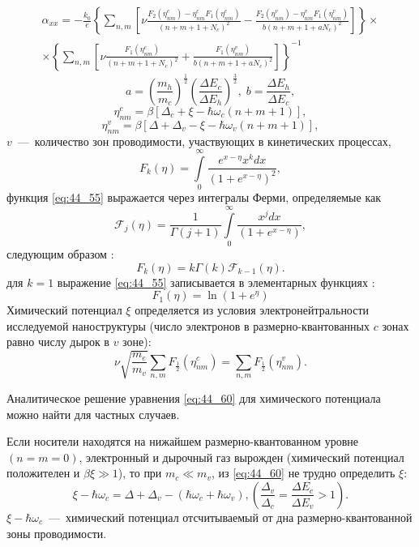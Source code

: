 \begin{multline} \label{eq:44_50}
\alpha _{xx} =-\frac{k_0}{e} \left\{\sum_{n,m}\left[\nu \frac{F_2 \left(\eta_{nm}^c \right)-\eta _{nm}^c F_1 \left(\eta_{nm}^c \right)}{\left(n+m+1+N_c \right)^2 } -\frac{F_2 \left(\eta_{nm}^v \right)-\eta_{nm}^v F_1 \left(\eta_{nm}^v \right)}{b\left(n+m+1+aN_c \right)^2 } \right] \right\}\times\\
\times \left\{\sum _{n,m}\left[\nu \frac{F_1 \left(\eta_{nm}^c \right)}{\left(n+m+1+N_c \right)^2 } +\frac{F_1 \left(\eta_{nm}^v \right)}{b\left(n+m+1+a N_c \right)^2 } \right] \right\}^{-1}
\end{multline}
\[
a=\left(\frac{m_h }{m_c } \right)^{\frac{1}{2} } \left(\frac{\Delta E_c }{\Delta E_h } \right)^{\frac{3}{2} } ,\;
b=\frac{\Delta E_h }{\Delta E_c } ,
\] 
\[
\eta_{nm}^c =\beta \left[\Delta_c +\xi -\hbar \omega_c \left(n+m+1\right)\right],
\] 
\[
\eta_{nm}^v =\beta \left[\Delta +\Delta_v -\xi -\hbar \omega_v \left(n+m+1\right)\right],
\]
$v$~---~количество зон проводимости, участвующих в кинетических процессах, 
\begin{equation} \label{eq:44_55}
F_k (\eta )=\int\limits_0^{\infty }{\frac{ e^{x-\eta } x^k dx}{\left(1 + e^{x-\eta }\right)^2 }} ,
\end{equation}
функция \eqref{eq:44_55} выражается через интегралы Ферми, определяемые как \cite{Dingle1957,Blakemore1982}
\[
\mathcal{F}_j (\eta )=\frac{1}{\Gamma(j+1)}\int\limits_0^{\infty }{\frac{x^j dx}{\left(1 + e^{x-\eta }\right) }} ,
\]
следующим образом \cite{Askerov1970}:
\[
F_k (\eta ) =k \Gamma(k) \mathcal{F}_{k-1} (\eta ).
\]
для $k=1$ выражение \eqref{eq:44_55} записывается в элементарных функциях \cite{Rhodes1950}:
\[
F_1 (\eta )=\ln \left(1 + e^{\eta }\right)
\]
Химический потенциал $\xi $ определяется из условия электронейтральности исследуемой наноструктуры (число электронов в размерно-квантованных $c$ зонах равно числу дырок в $v$ зоне):
\begin{equation} \label{eq:44_60}
\nu \sqrt{\frac{m_e }{m_v } } \sum_{n,m}F_{\frac{1}{2}}\left(\eta_{nm}^c \right) =\sum_{n,m}F_{ \frac{1}{2}} \left(\eta_{nm}^v \right) .
\end{equation}
 
Аналитическое решение уравнения \eqref{eq:44_60} для химического потенциала можно найти для частных случаев.
 
Если носители находятся на нижайшем размерно-квантованном уровне $(n=m=0)$, электронный и дырочный газ вырожден (химический потенциал положителен и $\beta \xi \gg 1$), то при $m_c \ll m_v $, из \eqref{eq:44_60} не трудно определить $\xi $:
\[
\xi -\hbar \omega_c =\Delta +\Delta_v -\left(\hbar \omega_c +\hbar \omega_v \right), \left(\frac{\Delta_v }{\Delta_c } =\frac{\Delta E_c }{\Delta E_v } >1\right).
\] 
$\xi -\hbar \omega_c $~---~химический потенциал отсчитываемый от дна размерно-квантованной зоны проводимости.

